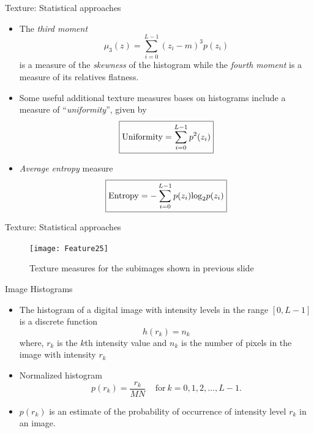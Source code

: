 \begin{frame}{Texture: Statistical approaches}
\vspace{-8pt}
\begin{small}
\begin{itemize}
\item The \textit{\color{mycolor1}third moment} 
\[\boxed{{\mu _3}(z) = \sum\limits_{i = 0}^{L - 1} {{{({z_i} - m)}^3}p({z_i})}} \]
is a measure of the \textit{\color{mycolor1}skewness} of the histogram while the \textit{\color{mycolor1}fourth moment} is a measure of its relatives flatness.
\item Some useful additional texture measures bases on histograms include a measure of ``\textit{\color{mycolor1}uniformity}'', given by
\[\boxed{{\rm Uniformity} = \sum\limits_{i = 0}^{L - 1} {{p^2}({z_i})} }\]
\item \textit{\color{mycolor1}Average entropy} measure
\[\boxed{{\rm Entropy} =  - \sum\limits_{i = 0}^{L - 1} {p({z_i}){{\log }_2}p({z_i})} }\]
\end{itemize}
\end{small}
\end{frame}

\begin{frame}{Texture: Statistical approaches}
\begin{figure}
\caption{Texture measures for the subimages shown in previous slide}
\texttt{[image: Feature25]}
\end{figure}
\end{frame}

\begin{frame}{Image Histograms}
\begin{itemize}
\item The {\color{mycolor2}histogram} of a digital image with intensity levels in the range $[0,L-1]$ is a discrete function
\begin{equation}
h(r_k) = n_k
\end{equation}
where, $r_k$ is the $k$th intensity value and $n_k$ is the number of pixels in the image with intensity $r_k$
\item Normalized histogram
\begin{equation}
p(r_k) = \frac{r_k}{MN}~~~~~\text{for}~k=0,1,2,\ldots,L-1.
\end{equation}
\item $p(r_k)$ is an estimate of the probability of occurrence of intensity level $r_k$ in an image.
\end{itemize}
\end{frame}


